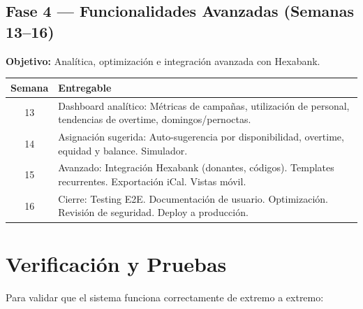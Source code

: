 \documentclass[10pt,a4paper]{article}
\begin{document}
\subsection{Fase 4 --- Funcionalidades Avanzadas (Semanas 13--16)}

\textbf{Objetivo:} Anal\'{i}tica, optimizaci\'{o}n e integraci\'{o}n avanzada con Hexabank.

\begin{table}[h!]
\centering
\begin{tabularx}{\textwidth}{|c|X|}
\hline
\textbf{Semana} & \textbf{Entregable} \\
\hline
13 & Dashboard anal\'{i}tico: M\'{e}tricas de campañas, utilizaci\'{o}n de personal, tendencias de overtime, domingos/pernoctas. \\
\hline
14 & Asignaci\'{o}n sugerida: Auto-sugerencia por disponibilidad, overtime, equidad y balance. Simulador. \\
\hline
15 & Avanzado: Integraci\'{o}n Hexabank (donantes, c\'{o}digos). Templates recurrentes. Exportaci\'{o}n iCal. Vistas m\'{o}vil. \\
\hline
16 & Cierre: Testing E2E. Documentaci\'{o}n de usuario. Optimizaci\'{o}n. Revisi\'{o}n de seguridad. Deploy a producci\'{o}n. \\
\hline
\end{tabularx}
\end{table}

\section{Verificaci\'{o}n y Pruebas}

Para validar que el sistema funciona correctamente de extremo a extremo:
\end{document}
